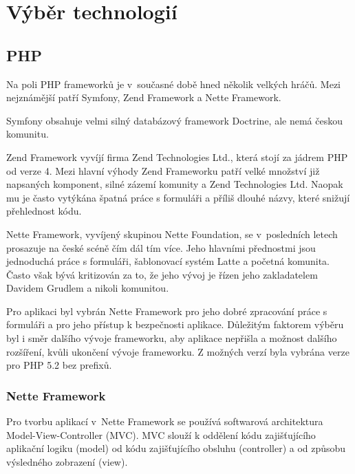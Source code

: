 \documentclass[thesis=B,czech]{FITthesis}[2011/06/14]
\begin{document}
\section{Výběr technologií}
\subsection{PHP}
Na poli PHP frameworků je v~současné době hned několik velkých hráčů. Mezi nejznámější patří Symfony, Zend Framework a Nette Framework.

Symfony obsahuje velmi silný databázový framework Doctrine, ale nemá českou komunitu.

Zend Framework vyvíjí firma Zend Technologies Ltd., která stojí za jádrem PHP od verze 4. Mezi hlavní výhody Zend Frameworku patří velké množství již napsaných komponent, silné zázemí komunity a Zend Technologies Ltd. Naopak mu je často vytýkána špatná práce s formuláři a příliš dlouhé názvy, které snižují přehlednost kódu. 

Nette Framework, vyvíjený skupinou Nette Foundation, se v~posledních letech prosazuje na české scéně čím dál tím více. Jeho hlavními přednostmi jsou jednoduchá práce s formuláři, šablonovací systém Latte a početná komunita. Často však bývá kritizován za to, že jeho vývoj je řízen jeho zakladatelem Davidem Grudlem a nikoli komunitou.

Pro aplikaci byl vybrán Nette Framework pro jeho dobré zpracování práce s formuláři a pro jeho přístup k bezpečnosti aplikace. Důležitým faktorem výběru byl i směr dalšího vývoje frameworku, aby aplikace nepřišla a možnost dalšího rozšíření, kvůli ukončení vývoje frameworku. Z možných verzí byla vybrána verze pro PHP 5.2 bez prefixů.

\subsubsection*{Nette Framework}\label{netteDescription}
Pro tvorbu aplikací v~Nette Framework se používá softwarová architektura Model-View-Controller (MVC). MVC slouží k oddělení kódu zajišťujícího aplikační logiku (model) od kódu zajišťujícího obsluhu (controller) a od způsobu výsledného zobrazení (view).

 \cite{netteModel}
\end{document}
